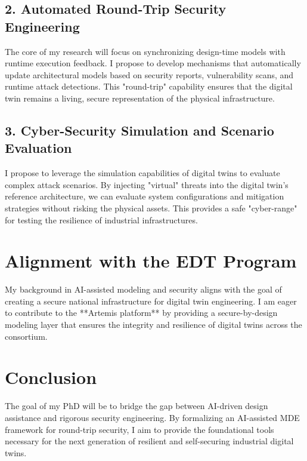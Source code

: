 \documentclass[a4paper,11pt]{article}
\begin{document}
\subsection{2. Automated Round-Trip Security Engineering}
The core of my research will focus on synchronizing design-time models with runtime execution feedback. I propose to develop mechanisms that automatically update architectural models based on security reports, vulnerability scans, and runtime attack detections. This "round-trip" capability ensures that the digital twin remains a living, secure representation of the physical infrastructure.

\subsection{3. Cyber-Security Simulation and Scenario Evaluation}
I propose to leverage the simulation capabilities of digital twins to evaluate complex attack scenarios. By injecting "virtual" threats into the digital twin's reference architecture, we can evaluate system configurations and mitigation strategies without risking the physical assets. This provides a safe "cyber-range" for testing the resilience of industrial infrastructures.

\section{Alignment with the EDT Program}
My background in AI-assisted modeling and security aligns with the goal of creating a secure national infrastructure for digital twin engineering. I am eager to contribute to the **Artemis platform** by providing a secure-by-design modeling layer that ensures the integrity and resilience of digital twins across the consortium.

\section{Conclusion}
The goal of my PhD will be to bridge the gap between AI-driven design assistance and rigorous security engineering. By formalizing an AI-assisted MDE framework for round-trip security, I aim to provide the foundational tools necessary for the next generation of resilient and self-securing industrial digital twins.
\end{document}
